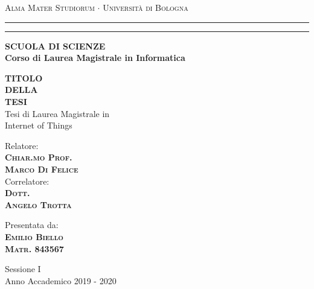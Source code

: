     \begin{titlepage}
        \begin{center}
            {{\Large{\textsc{Alma Mater Studiorum $\cdot$ Università di Bologna}}}}
            \rule[0.1cm]{15.8cm}{0.1mm}
            \rule[0.5cm]{15.8cm}{0.6mm}
            {\small{\bf SCUOLA DI SCIENZE\\
            Corso di Laurea Magistrale in Informatica }}
        \end{center}
        
        \vspace{15mm}
        \begin{center}
            {\LARGE{\bf TITOLO}}\\
            \vspace{3mm}
            {\LARGE{\bf DELLA}}\\
            \vspace{3mm}
            {\LARGE{\bf TESI}}\\
            \vspace{10mm} 
            {\large{\sc Tesi di Laurea Magistrale in \\ Internet of Things}}
        \end{center}
        \vspace{40mm}
        \par
        \noindent
        \begin{minipage}[t]{0.47\textwidth}
            {\large{\sc Relatore:}\\
            {\bf \textsc{Chiar.mo Prof.\\
            Marco Di Felice}}}\\
            \vskip 8pt
            {\large{\sc Correlatore:}\\
            {\bf \textsc{Dott.\\
            Angelo Trotta}}}
        \end{minipage}
        \hfill
        \begin{minipage}[t]{0.47\textwidth}\raggedleft
            {\large{\sc Presentata da:}\\
            \vspace{2mm}
            {\bf \textsc{Emilio Biello}}}\\
            \vspace{0.5mm}
            {\bf \textsc{Matr. 843567}}
        \end{minipage}
        \vspace{20mm}
        \begin{center}
            {\large{\sc Sessione I\\%
                Anno Accademico 2019 - 2020}}%
        \end{center}
    \end{titlepage}
\restoregeometry
